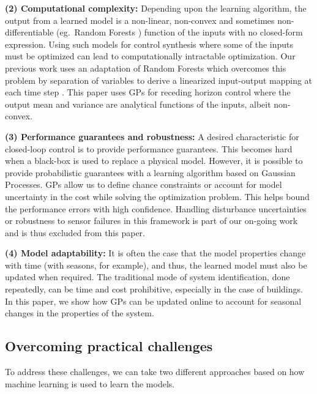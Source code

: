 \noindent \textbf{(2) Computational complexity:} Depending upon the learning algorithm, the output from a learned model is a non-linear, non-convex and sometimes non-differentiable (eg.~Random Forests \cite{Friedman2001}) function of the inputs with no closed-form expression. 
Using such models for control synthesis where some of the inputs must be optimized can lead to computationally intractable optimization. 
Our previous work uses an adaptation of Random Forests which overcomes this problem by separation of variables to derive a linearized input-output mapping at each time step \cite{JainACC2017,JainCDC2017}.
This paper uses GPs for receding horizon control where the output mean and variance are analytical functions of the inputs, albeit non-convex.

\noindent \textbf{(3) Performance guarantees and robustness:} A desired characteristic for closed-loop control is to provide performance guarantees. 
This becomes hard when a black-box is used to replace a physical model. 
However, it is possible to provide probabilistic guarantees with a learning algorithm based on Gaussian Processes. 
GPs allow us to define chance constraints or account for model uncertainty in the cost while solving the optimization problem. This helps bound the performance errors with high confidence. 
Handling disturbance uncertainties or robustness to sensor failures in this framework is part of our on-going work and is thus excluded from this paper.

\noindent \textbf{(4) Model adaptability:} It is often the case that the model properties change with time (with seasons, for example), and thus, the learned model must also be updated when required. 
The traditional mode of system identification, done repeatedly, can be time and cost prohibitive, especially in the case of buildings. 
In this paper, we show how GPs can be updated online to account for seasonal changes in the properties of the system.


\subsection{Overcoming practical challenges}
To address these challenges, we can take two different approaches based on how machine learning is used to learn the models.

